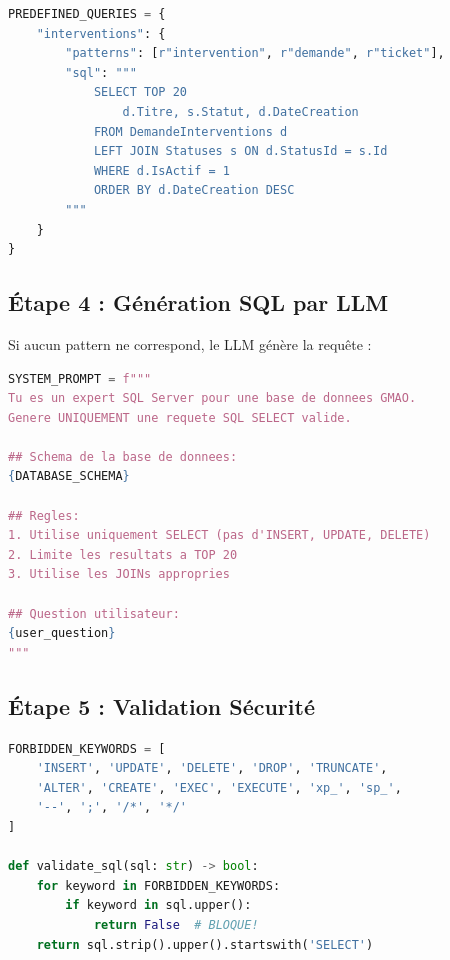 \documentclass[12pt,a4paper]{article}
\begin{document}
\begin{lstlisting}[language=Python, caption=Patterns prédéfinis]
PREDEFINED_QUERIES = {
    "interventions": {
        "patterns": [r"intervention", r"demande", r"ticket"],
        "sql": """
            SELECT TOP 20
                d.Titre, s.Statut, d.DateCreation
            FROM DemandeInterventions d
            LEFT JOIN Statuses s ON d.StatusId = s.Id
            WHERE d.IsActif = 1
            ORDER BY d.DateCreation DESC
        """
    }
}
\end{lstlisting}

\subsection{Étape 4 : Génération SQL par LLM}

Si aucun pattern ne correspond, le LLM génère la requête :

\begin{lstlisting}[language=Python, caption=Prompt Engineering pour le LLM]
SYSTEM_PROMPT = f"""
Tu es un expert SQL Server pour une base de donnees GMAO.
Genere UNIQUEMENT une requete SQL SELECT valide.

## Schema de la base de donnees:
{DATABASE_SCHEMA}

## Regles:
1. Utilise uniquement SELECT (pas d'INSERT, UPDATE, DELETE)
2. Limite les resultats a TOP 20
3. Utilise les JOINs appropries

## Question utilisateur:
{user_question}
"""
\end{lstlisting}

\subsection{Étape 5 : Validation Sécurité}

\begin{dangerbox}[title={\faShieldAlt\ Validation SQL - Sécurité}]
\begin{lstlisting}[language=Python, caption=Validation de sécurité]
FORBIDDEN_KEYWORDS = [
    'INSERT', 'UPDATE', 'DELETE', 'DROP', 'TRUNCATE',
    'ALTER', 'CREATE', 'EXEC', 'EXECUTE', 'xp_', 'sp_',
    '--', ';', '/*', '*/'
]

def validate_sql(sql: str) -> bool:
    for keyword in FORBIDDEN_KEYWORDS:
        if keyword in sql.upper():
            return False  # BLOQUE!
    return sql.strip().upper().startswith('SELECT')
\end{lstlisting}
\end{dangerbox}
\end{document}

